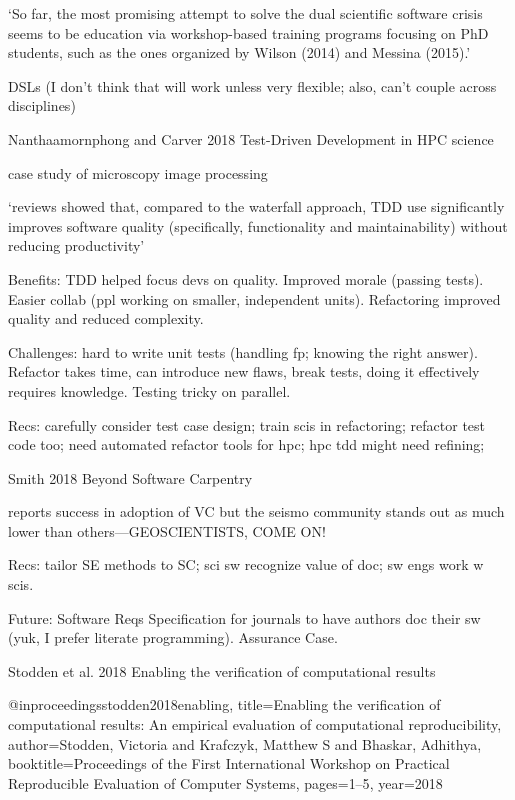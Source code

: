 \documentclass[12pt]{amsart}
\begin{document}
`So far, the most promising attempt to solve the dual scientific software crisis seems to be education via workshop-based training programs focusing on PhD students, such as the ones organized by Wilson (2014) and Messina (2015).'

DSLs (I don't think that will work unless very flexible; also, can't couple across disciplines)



Nanthaamornphong and Carver 2018 Test-Driven Development in HPC science

case study of microscopy image processing

`reviews showed that, compared to the waterfall approach, TDD use significantly improves software quality (specifically, functionality and maintainability) without reducing productivity'

Benefits: TDD helped focus devs on quality. Improved morale (passing tests). Easier collab (ppl working on smaller, independent units). Refactoring improved quality and reduced complexity.

Challenges: hard to write unit tests (handling fp; knowing the right answer). Refactor takes time, can introduce new flaws, break tests, doing it effectively requires knowledge. Testing tricky on parallel.

Recs: carefully consider test case design; train scis in refactoring; refactor test code too; need automated refactor tools for hpc; hpc tdd might need refining; 




Smith 2018 Beyond Software Carpentry

reports success in adoption of VC but the seismo community stands out as much lower than others---GEOSCIENTISTS, COME ON!

Recs: tailor SE methods to SC; sci sw recognize value of doc; sw engs work w scis. 

Future: Software Reqs Specification for journals to have authors doc their sw (yuk, I prefer literate programming). Assurance Case. 



Stodden et al. 2018 Enabling the verification of computational results

@inproceedings{stodden2018enabling,
  title={Enabling the verification of computational results: An empirical evaluation of computational reproducibility},
  author={Stodden, Victoria and Krafczyk, Matthew S and Bhaskar, Adhithya},
  booktitle={Proceedings of the First International Workshop on Practical Reproducible Evaluation of Computer Systems},
  pages={1--5},
  year={2018}
}
\end{document}
